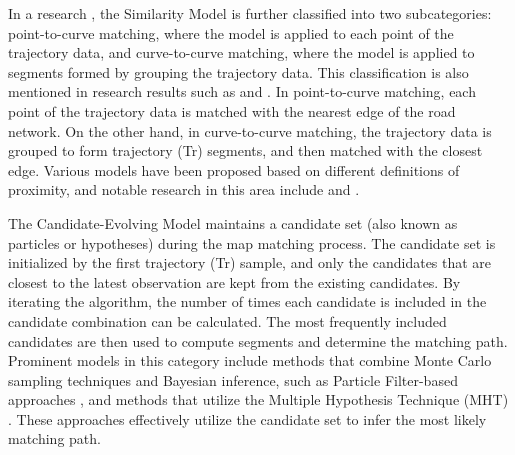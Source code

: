 \documentclass[preprint,12pt]{elsarticle}
\begin{document}
In a research \cite{quddus2007current}, the Similarity Model is further classified into two subcategories: point-to-curve matching, where the model is applied to each point of the trajectory data, and curve-to-curve matching, where the model is applied to segments formed by grouping the trajectory data. This classification is also mentioned in research results such as \cite{wei2013map} and \cite{zhu2017trajectory}.
In point-to-curve matching, each point of the trajectory data is matched with the nearest edge of the road network. On the other hand, in curve-to-curve matching, the trajectory data is grouped to form trajectory (Tr) segments, and then matched with the closest edge. Various models have been proposed based on different definitions of proximity, and notable research in this area include \cite{sharma2019map} and \cite{cui2021hidden}.

The Candidate-Evolving Model maintains a candidate set (also known as particles or hypotheses) during the map matching process. The candidate set is initialized by the first trajectory (Tr) sample, and only the candidates that are closest to the latest observation are kept from the existing candidates. By iterating the algorithm, the number of times each candidate is included in the candidate combination can be calculated. The most frequently included candidates are then used to compute segments and determine the matching path.
Prominent models in this category include methods that combine Monte Carlo sampling techniques and Bayesian inference, such as Particle Filter-based approaches \cite{wang2016improved, bonnifait2009multi}, and methods that utilize the Multiple Hypothesis Technique (MHT) \cite{taguchi2018online}. These approaches effectively utilize the candidate set to infer the most likely matching path.
\end{document}
